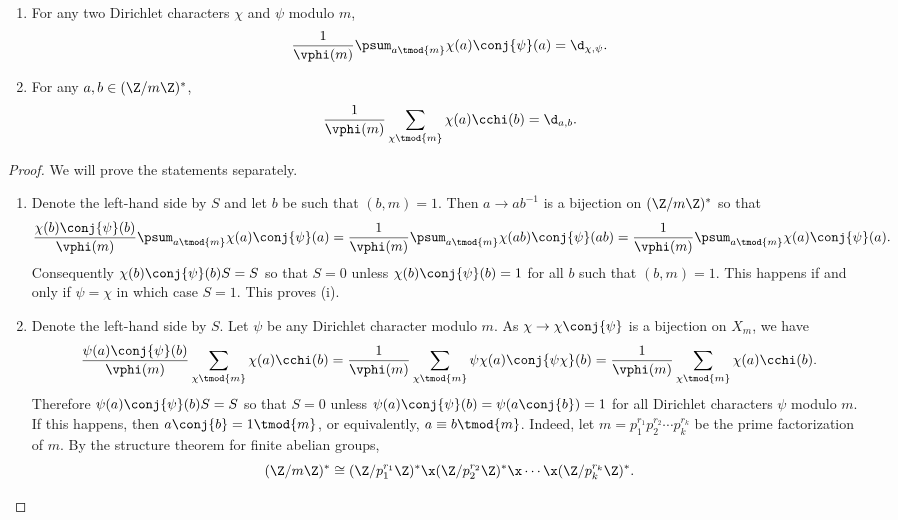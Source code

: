       \begin{proposition}\label{prop:Dirichlet_orthogonality_relations}
      \phantom{ }
        \begin{enumerate}[label=(\roman*)]
          \item For any two Dirichlet characters $\chi$ and $\psi$ modulo $m$,
          \[
            \frac{1}{\vphi(m)}\psum_{a \tmod{m}}\chi(a)\conj{\psi}(a) = \d_{\chi,\psi}.
          \]
          \item For any $a,b \in (\Z/m\Z)^{\ast}$,
          \[
            \frac{1}{\vphi(m)}\sum_{\chi \tmod{m}}\chi(a)\cchi(b) = \d_{a,b}.
          \]
        \end{enumerate}
      \end{proposition}
      \begin{proof}
        We will prove the statements separately.
        \begin{enumerate}[label=(\roman*)]
          \item Denote the left-hand side by $S$ and let $b$ be such that $(b,m) = 1$. Then $a \to ab^{-1}$ is a bijection on $(\Z/m\Z)^{\ast}$ so that
          \[
            \frac{\chi(b)\conj{\psi}(b)}{\vphi(m)}\psum_{a \tmod{m}}\chi(a)\conj{\psi}(a) = \frac{1}{\vphi(m)}\psum_{a \tmod{m}}\chi(ab)\conj{\psi}(ab) = \frac{1}{\vphi(m)}\psum_{a \tmod{m}}\chi(a)\conj{\psi}(a).
          \]
          Consequently $\chi(b)\conj{\psi}(b)S = S$ so that $S = 0$ unless $\chi(b)\conj{\psi}(b) = 1$ for all $b$ such that $(b,m) = 1$. This happens if and only if $\psi = \chi$ in which case $S = 1$. This proves (i).
          \item Denote the left-hand side by $S$. Let $\psi$ be any Dirichlet character modulo $m$. As $\chi \to \chi\conj{\psi}$ is a bijection on $X_{m}$, we have
          \[
            \frac{\psi(a)\conj{\psi}(b)}{\vphi(m)}\sum_{\chi \tmod{m}}\chi(a)\cchi(b) = \frac{1}{\vphi(m)}\sum_{\chi \tmod{m}}\psi\chi(a)\conj{\psi\chi}(b) = \frac{1}{\vphi(m)}\sum_{\chi \tmod{m}}\chi(a)\cchi(b).
          \]
          Therefore $\psi(a)\conj{\psi}(b)S = S$ so that $S = 0$ unless $\psi(a)\conj{\psi}(b) = \psi(a\conj{b}) = 1$ for all Dirichlet characters $\psi$ modulo $m$. If this happens, then $a\conj{b} = 1 \tmod{m}$, or equivalently, $a \equiv b \tmod{m}$. Indeed, let $m = p_{1}^{r_{1}}p_{2}^{r_{2}} \cdots p_{k}^{r_{k}}$ be the prime factorization of $m$. By the structure theorem for finite abelian groups,
          \[
            (\Z/m\Z)^{\ast} \cong (\Z/p_{1}^{r_{1}}\Z)^{\ast} \x (\Z/p_{2}^{r_{2}}\Z)^{\ast} \x \cdots \x (\Z/p_{k}^{r_{k}}\Z)^{\ast}.
\]
\end{enumerate}
\end{proof}
